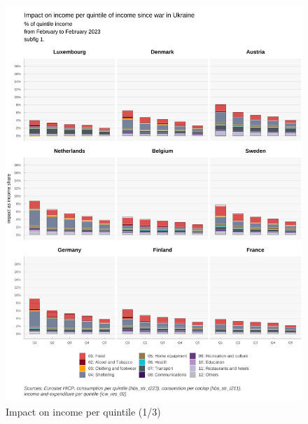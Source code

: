 \documentclass[
  9pt,
  a4paper,
  numbers=noendperiod,
  DIV=12]{scrartcl}
\begin{document}
\begin{figure}

\caption{Impact on income per quintile (1/3)}

{\centering \includegraphics{svg/coicop_l1_1y_1.png}

}

\end{figure}
\end{document}
